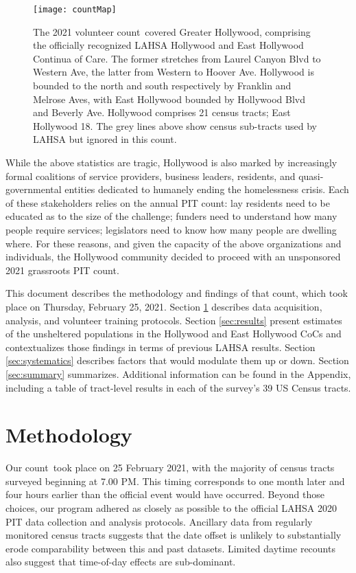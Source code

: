 \documentclass[11pt,twocolumn]{article}
\def\Count{count}
\begin{document}
\begin{figure}
	\centering
	\texttt{[image: countMap]}
	\caption{The 2021 volunteer \Count\ covered Greater Hollywood, comprising the 
			officially recognized LAHSA Hollywood and East Hollywood Continua
			of Care. The former stretches from Laurel Canyon Blvd to Western Ave,
			the latter from Western to Hoover Ave. Hollywood is bounded to the north
			and south respectively by Franklin	and Melrose Aves, with East Hollywood
			bounded by Hollywood Blvd and Beverly Ave. Hollywood comprises
			21 census tracts; East Hollywood 18. The grey lines above show census 
			sub-tracts used by LAHSA but ignored in this \Count.}
	\label{fig:map}	
\end{figure}

While the above statistics are tragic, Hollywood is also marked by increasingly formal coalitions of 
service providers, business leaders, residents, and quasi-governmental entities dedicated to humanely 
ending the homelessness crisis. Each of these stakeholders relies on the annual PIT count: lay residents need
to be educated as to the size of the challenge; funders need to understand how many people require services;
legislators need to know how many people are dwelling where. For these reasons, and given the 
capacity of the above organizations and individuals, the Hollywood community decided to proceed with 
an unsponsored 2021 grassroots PIT \Count.

This document describes the methodology and findings of that \Count, which took place on Thursday, 
February 25, 2021. Section \ref{sec:procedure} describes data acquisition, analysis, and volunteer
training protocols. Section \ref{sec:results} present estimates of the unsheltered 
populations in the Hollywood and East Hollywood CoCs and contextualizes those findings in terms of 
previous LAHSA results. Section \ref{sec:systematics} describes factors that would
modulate them up or down. Section \ref{sec:summary} summarizes. Additional information
can be found in the Appendix, including a table of tract-level results in each of the survey's 39 US 
Census tracts.

\section{Methodology}
\label{sec:procedure}

Our \Count\ took place on 25 February 2021, with the majority of census tracts surveyed beginning
at 7.00 PM. This timing corresponds to one month later and four hours earlier than the official event 
would have occurred. Beyond those choices, our program adhered as closely as possible to the official 
LAHSA 2020 PIT data collection and analysis protocols. Ancillary data from regularly monitored 
census tracts suggests that the date offset is unlikely to substantially erode comparability between 
this and past datasets. Limited daytime recounts also suggest that time-of-day effects are sub-dominant.
\end{document}
